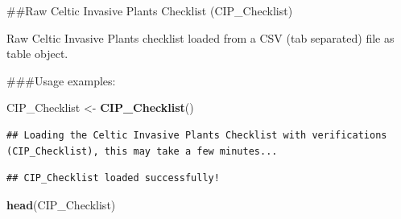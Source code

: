 \documentclass[
]{article}
\newenvironment{Shaded}{\begin{snugshade}}{\end{snugshade}}
\newcommand{\FunctionTok}[1]{\textcolor[rgb]{0.13,0.29,0.53}{\textbf{#1}}}
\newcommand{\NormalTok}[1]{#1}
\newcommand{\OtherTok}[1]{\textcolor[rgb]{0.56,0.35,0.01}{#1}}
\begin{document}
\#\#Raw Celtic Invasive Plants Checklist (CIP\_Checklist)

Raw Celtic Invasive Plants checklist loaded from a CSV (tab separated)
file as table object.

\#\#\#Usage examples:

\begin{Shaded}
\begin{Highlighting}[]
\NormalTok{CIP\_Checklist }\OtherTok{\textless{}{-}} \FunctionTok{CIP\_Checklist}\NormalTok{()}
\end{Highlighting}
\end{Shaded}

\begin{verbatim}
## Loading the Celtic Invasive Plants Checklist with verifications (CIP_Checklist), this may take a few minutes...
\end{verbatim}

\begin{verbatim}
## CIP_Checklist loaded successfully!
\end{verbatim}

\begin{Shaded}
\begin{Highlighting}[]
\FunctionTok{head}\NormalTok{(CIP\_Checklist)}
\end{Highlighting}
\end{Shaded}
\end{document}
